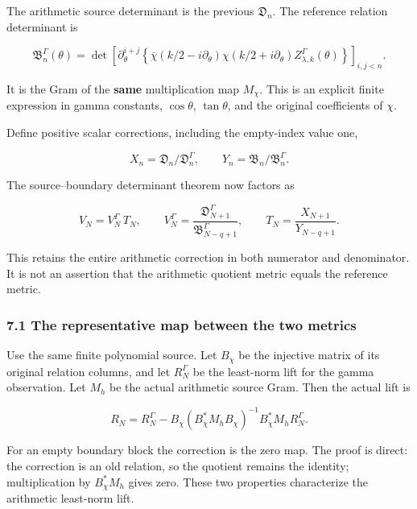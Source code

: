 The arithmetic source determinant is the previous \(\mathfrak D_n\). The reference relation
determinant is

\[
\mathfrak B_n^\Gamma(\theta)
=\det\left[\partial_\theta^{i+j}
 \left\{\overline\chi(k/2-i\partial_\theta)
       \chi(k/2+i\partial_\theta)
       Z_{\lambda,k}^\Gamma(\theta)\right\}\right]_{i,j<n}.         \tag{30}
\]

It is the Gram of the \textbf{same} multiplication map \(M_\chi\). This is an explicit finite
expression in gamma constants, \(\cos\theta\), \(\tan\theta\), and the original coefficients of
\(\chi\).

Define positive scalar corrections, including the empty-index value one,

\[
X_n=\mathfrak D_n/\mathfrak D_n^\Gamma,\qquad
Y_n=\mathfrak B_n/\mathfrak B_n^\Gamma.
\]

The source--boundary determinant theorem now factors as

\[
\boxed{
V_N=V_N^\Gamma\,T_N,\qquad
 V_N^\Gamma=\frac{\mathfrak D_{N+1}^\Gamma}{\mathfrak B_{N-q+1}^\Gamma},\qquad
 T_N=\frac{X_{N+1}}{Y_{N-q+1}}.
}                                                                   \tag{31}
\]

This retains the entire arithmetic correction in both numerator and denominator. It is not an
assertion that the arithmetic quotient metric equals the reference metric.

\subsubsection{7.1 The representative map between the two
metrics}\label{gamma_convolution:the-representative-map-between-the-two-metrics}

Use the same finite polynomial source. Let \(B_\chi\) be the injective matrix of its original
relation columns, and let \(R_N^\Gamma\) be the least-norm lift for the gamma observation. Let
\(M_h\) be the actual arithmetic source Gram. Then the actual lift is

\[
\boxed{
R_N=R_N^\Gamma-
B_\chi(B_\chi^*M_hB_\chi)^{-1}B_\chi^*M_hR_N^\Gamma.
}                                                                   \tag{32}
\]

For an empty boundary block the correction is the zero map. The proof is direct: the correction is
an old relation, so the quotient remains the identity; multiplication by \(B_\chi^*M_h\) gives zero.
These two properties characterize the arithmetic least-norm lift.

